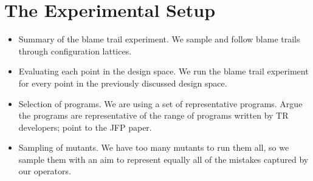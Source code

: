 \section{The Experimental Setup}

\begin{itemize}

\item Summary of the blame trail experiment. We sample and follow blame trails through configuration
        lattices.

\item Evaluating each point in the design space. We run the blame trail experiment for every point in the
        previously discussed design space.

\item Selection of programs. We are using a set of representative
  programs. Argue the programs are representative of the range of programs written by TR developers; point to the JFP paper.

\item Sampling of mutants. We have too many mutants to run them all, so we sample them with an aim to represent equally all of the mistakes captured by our operators.

\end{itemize}
